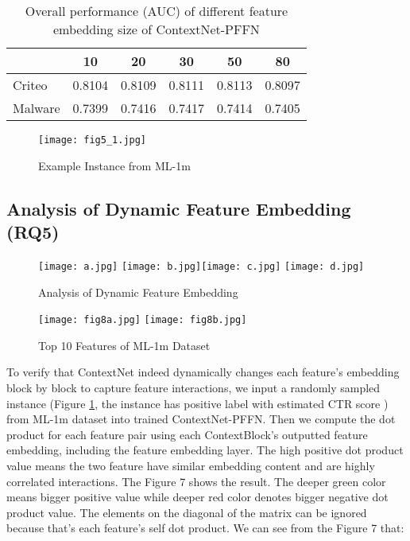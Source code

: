 \documentclass[sigconf]{acmart}
\begin{document}
\begin{table}[h]
\centering
\caption{Overall performance (AUC) of different feature embedding size of ContextNet-PFFN}
\begin{tabular}{l|ccccc}
\toprule
 & \textbf{10} & \textbf{20} & \textbf{30} & \textbf{50} & \textbf{80}  \\
\midrule
   Criteo & 0.8104 & 0.8109 & 0.8111 & 0.8113 & 0.8097 \\
   Malware & 0.7399 & 0.7416 & 0.7417 & 0.7414 & 0.7405 \\
\bottomrule
\end{tabular}\label{tab:differentembeddingsize}
\end{table}





\begin{figure}
  \setlength{\abovecaptionskip}{0pt}
  \centering
  \texttt{[image: fig5\_1.jpg]}
  \caption{Example Instance from ML-1m}
  \label{fig.fig5}
\end{figure}

\subsection{Analysis of Dynamic Feature Embedding (RQ5)}

\begin{figure}
  \setlength{\abovecaptionskip}{2pt}
  \centering
  \texttt{[image: a.jpg]}\hfill
  \texttt{[image: b.jpg]}\texttt{[image: c.jpg]}\hfill
  \texttt{[image: d.jpg]}
  \label{fig.featureemb}
  \caption{Analysis of Dynamic Feature Embedding}
\end{figure}

\begin{figure}
  \setlength{\abovecaptionskip}{2pt}
  \centering
  \texttt{[image: fig8a.jpg]}\hfill
  \texttt{[image: fig8b.jpg]}
  \label{fig.fig8}
  \caption{Top 10 Features of ML-1m Dataset}
\end{figure}

To verify that ContextNet indeed dynamically changes each feature’s embedding block by block to capture feature interactions, we input a randomly sampled instance (Figure \ref{fig.fig5}, the instance has positive label with estimated CTR score )  from ML-1m dataset into trained ContextNet-PFFN. Then we compute the dot product for each feature pair using each ContextBlock’s outputted feature embedding, including the feature embedding layer. The high positive dot product value means the two feature have similar embedding content and are highly correlated interactions.  The Figure 7 shows the result. The deeper green color means bigger positive value while deeper red color denotes bigger negative dot product value. The elements on the diagonal of the matrix can be ignored because that's  each feature's  self dot product.  We can see from the Figure 7 that:
\end{document}
